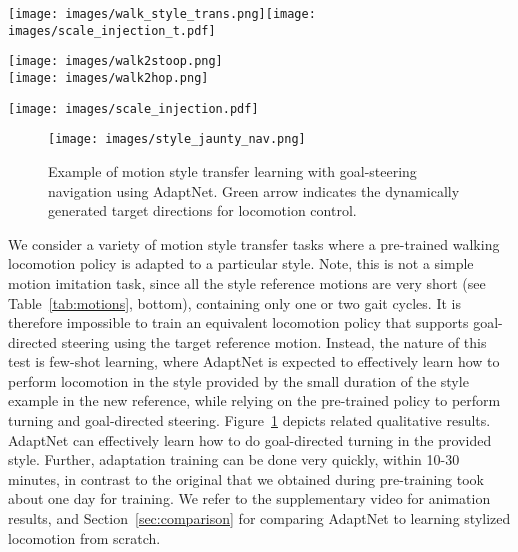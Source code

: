 \begin{figure*}[t]
    \centering
    \texttt{[image: images/walk\_style\_trans.png]}\hfill\texttt{[image: images/scale\_injection\_t.pdf]}\qquad\qquad\qquad\qquad\qquad
    
    \texttt{[image: images/walk2stoop.png]}\\\vspace{0.2cm}
    \texttt{[image: images/walk2hop.png]}\\\vspace{0.2cm}
    
    \hfill\texttt{[image: images/scale\_injection.pdf]}\qquad\qquad\qquad\qquad\qquad
    \caption{Motion interpolation between walking (pre-trained policy) shown at the top-left corner and different stylized motions by controlling the adaptation level of the associated AdaptNet model (cf. Eq.~\ref{eq:motion_interp}). 
    Snapshots on the left show the learned stylized motions of \textit{Stoop} walking and \textit{Jaunty Skip}.
    When $\alpha=0$, %
    the character is controlled only by the original walking policy. 
    When $\alpha=1$, 
    the character is controlled with a full injection of AdaptNet.
    }
    \label{fig:style_interp}
\end{figure*}

\begin{figure}[t]
    \centering
    \texttt{[image: images/style\_jaunty\_nav.png]}%
    \caption{Example of motion style transfer learning %
    with goal-steering navigation using AdaptNet.
    Green arrow indicates the dynamically generated target directions for locomotion control. 
}
    \label{fig:style_trans_nav}
\end{figure}

We consider a variety of 
motion style transfer tasks where a pre-trained walking locomotion policy is adapted to a particular style. 
Note, this is not a simple motion imitation task, since 
all the style reference motions %
are very short (see Table~\ref{tab:motions}, bottom),  containing only one or two gait cycles.  
It is therefore impossible to train an equivalent locomotion policy that supports goal-directed steering using the target reference motion. 
Instead, the nature of this test is few-shot learning, 
where AdaptNet is expected to effectively learn how to perform locomotion in the style provided by the small duration of the style
example in the new reference, 
while relying on the pre-trained policy to perform turning and goal-directed steering. 
Figure~\ref{fig:style_trans_nav} depicts related qualitative results. 
AdaptNet can effectively learn how to do goal-directed turning in the provided style.  
Further, adaptation training can be done very quickly, within 10-30 minutes, 
in contrast to 
the original that we obtained during pre-training took about one day for training.
We refer to the supplementary video for  animation results, and Section~\ref{sec:comparison} for comparing  AdaptNet to learning stylized locomotion from scratch.  %







